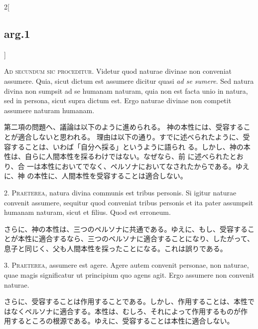 \documentclass[paper=a4paper,fontsize=10pt,jafontsize=9pt,titlepage]{jlreq}
\begin{document}
\begin{paracol}{2}[\subsection{arg.1}]

{\Huge A}{\scshape d secundum sic proceditur}. Videtur quod naturae divinae non conveniat
 assumere. Quia, sicut dictum est assumere dicitur quasi {\itshape ad se
 sumere}. Sed natura divina non sumpsit ad se humanam naturam, quia non
 est facta unio in natura, sed in persona, sicut supra dictum est. Ergo
 naturae divinae non competit assumere naturam humanam.

\switchcolumn

第二項の問題へ、議論は以下のように進められる。
神の本性には、受容することが適合しないと思われる。
理由は以下の通り。すでに述べられたように、受容することは、いわば「自分へ採る」というように語られ
 る。しかし、神の本性は、自らに人間本性を採るわけではない。なぜなら、前
 に述べられたとおり、合
 一は本性においてでなく、ペルソナにおいてなされたからである。ゆえに、神
 の本性に、人間本性を受容することは適合しない。


2. {\scshape Praeterea}, natura divina communis est tribus personis. Si igitur naturae
 convenit assumere, sequitur quod conveniat tribus personis et ita pater
 assumpsit humanam naturam, sicut et filius. Quod est erroneum.

\switchcolumn

さらに、神の本性は、三つのペルソナに共通である。ゆえに、もし、受容するこ
 とが本性に適合するなら、三つのペルソナに適合することになり、したがって、
 息子と同じく、父も人間本性を採ったことになる。これは誤りである。


3. {\scshape Praeterea}, assumere est agere. Agere autem convenit personae, non
 naturae, quae magis significatur ut principium quo agens agit. Ergo
 assumere non convenit naturae.

\switchcolumn

さらに、受容することは作用することである。しかし、作用することは、本性で
 はなくペルソナに適合する。本性は、むしろ、それによって作用するものが作
 用するところの根源である。ゆえに、受容することは本性に適合しない。


\end{paracol}
\end{document}
